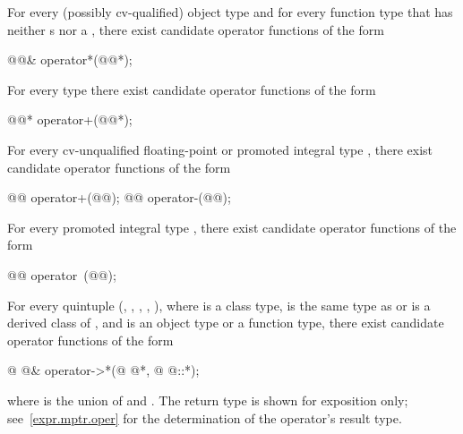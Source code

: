 \pnum
For every (possibly cv-qualified) object type  and
for every function type 
that has neither s nor a ,
there exist candidate operator functions of the form
\begin{codeblock}
@@&    operator*(@@*);
\end{codeblock}

\pnum
For every type  there exist candidate operator functions of the form
\begin{codeblock}
@@*    operator+(@@*);
\end{codeblock}

\pnum
For every cv-unqualified floating-point or promoted integral type ,
there exist candidate operator functions of the form
\begin{codeblock}
@@ operator+(@@);
@@ operator-(@@);
\end{codeblock}

\pnum
For every promoted integral type
,
there exist candidate operator functions of the form
\begin{codeblock}
@@ operator~(@@);
\end{codeblock}

\pnum
For every quintuple
(,
,
,
,
),
where
is a class type,
is the same type as  or is a derived class of , and
is an object type or a function type,
there exist candidate operator functions of the form
\begin{codeblock}
@ @& operator->*(@ @*, @ @::*);
\end{codeblock}
where  is the union of  and .
The return type is shown for exposition only; see~\ref{expr.mptr.oper} for the
determination of the operator's result type.

